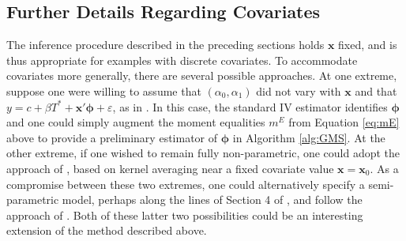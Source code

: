 \subsection{Further Details Regarding Covariates}
\label{sec:covariates}

The inference procedure described in the preceding sections holds $\mathbf{x}$ fixed, and is thus appropriate for examples with discrete covariates.
To accommodate covariates more generally, there are several possible approaches.
At one extreme, suppose one were willing to assume that $(\alpha_0, \alpha_1)$ did not vary with $\mathbf{x}$ and that $y = c + \beta T^* + \mathbf{x}'\boldsymbol{\phi} + \varepsilon$, as in \cite{FL}.
In this case, the standard IV estimator identifies $\boldsymbol{\phi}$ and one could simply augment the moment equalities $m^E$ from Equation \ref{eq:mE} above to provide a preliminary estimator of $\boldsymbol{\phi}$ in Algorithm \ref{alg:GMS}.
At the other extreme, if one wished to remain fully non-parametric, one could adopt the approach of \cite{andrews2014nonparametric}, based on kernel averaging near a fixed covariate value $\mathbf{x} = \mathbf{x}_0$.
As a compromise between these two extremes, one could alternatively specify a semi-parametric model, perhaps along the lines of Section 4 of \cite{Lewbel}, and follow the approach of \cite{andrews2013inference}.
Both of these latter two possibilities could be an interesting extension of the method described above.
